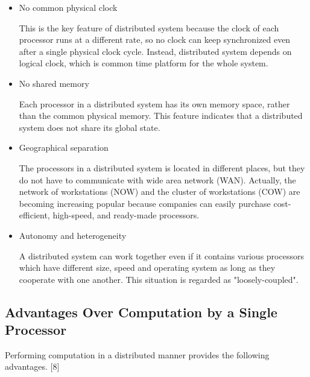  \begin{itemize}
 
      \item No common physical clock 
      
      This is the key feature of distributed system because the clock of each processor runs at a different rate, so no clock can keep synchronized even after a single physical clock cycle.  Instead, distributed system depends on logical clock, which is common time platform for the whole system.
      
     \item No shared memory
     
     Each processor in a distributed system has its own memory space, rather than the common physical memory.  This feature indicates that a distributed system does not share its global state.
     
     
      \item Geographical separation
      
      The processors in a distributed system is located in different places, but they do not have to communicate with wide area network (WAN).  Actually, the network of workstations (NOW) and the cluster of workstations (COW) are becoming increasing popular because companies can easily purchase cost-efficient, high-speed, and ready-made processors. 
      
     \item Autonomy and heterogeneity
     
     A distributed system can work together even if it contains various processors which have different size, speed and operating system as long as they cooperate with one another.  This situation is regarded as "loosely-coupled".
     
\end{itemize}

\subsection{Advantages Over Computation by a Single Processor}

Performing computation in a distributed manner provides the following advantages. [8]


